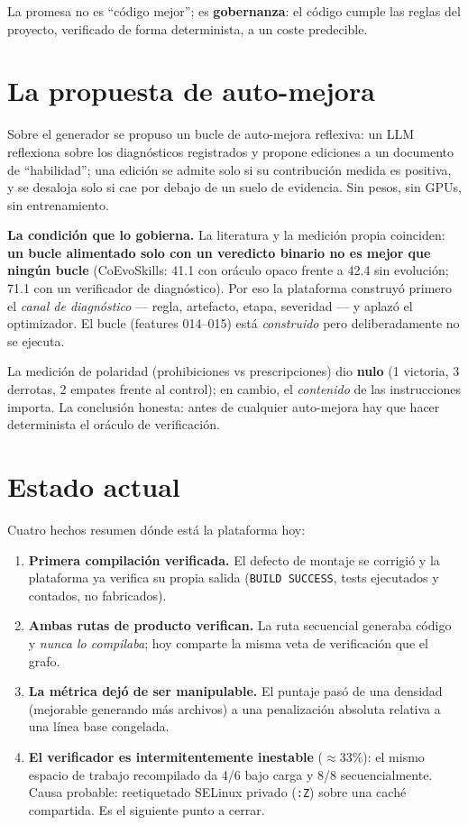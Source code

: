 \documentclass[11pt,a4paper]{article}
\begin{document}
La promesa no es ``código mejor''; es \textbf{gobernanza}: el código cumple las reglas
del proyecto, verificado de forma determinista, a un coste predecible.

\section{La propuesta de auto-mejora}

Sobre el generador se propuso un bucle de auto-mejora reflexiva: un LLM reflexiona
sobre los diagnósticos registrados y propone ediciones a un documento de
``habilidad''; una edición se admite solo si su contribución medida es positiva, y se
desaloja solo si cae por debajo de un suelo de evidencia. Sin pesos, sin GPUs, sin
entrenamiento.

\begin{notebox}
\textbf{La condición que lo gobierna.} La literatura y la medición propia coinciden:
\textbf{un bucle alimentado solo con un veredicto binario no es mejor que ningún
bucle} (CoEvoSkills: 41.1 con oráculo opaco frente a 42.4 sin evolución; 71.1 con un
verificador de diagnóstico). Por eso la plataforma construyó primero el \emph{canal de
diagnóstico} --- regla, artefacto, etapa, severidad --- y aplazó el optimizador. El
bucle (features 014--015) está \emph{construido} pero deliberadamente no se ejecuta.
\end{notebox}

La medición de polaridad (prohibiciones vs prescripciones) dio \textbf{nulo} (1
victoria, 3 derrotas, 2 empates frente al control); en cambio, el \emph{contenido} de
las instrucciones importa. La conclusión honesta: antes de cualquier auto-mejora hay
que hacer determinista el oráculo de verificación.

\section{Estado actual}

Cuatro hechos resumen dónde está la plataforma hoy:

\begin{enumerate}[leftmargin=1.4em]
  \item \textbf{Primera compilación verificada.} El defecto de montaje se corrigió y
  la plataforma ya verifica su propia salida (\texttt{BUILD SUCCESS}, tests
  ejecutados y contados, no fabricados).
  \item \textbf{Ambas rutas de producto verifican.} La ruta secuencial generaba código
  y \emph{nunca lo compilaba}; hoy comparte la misma veta de verificación que el grafo.
  \item \textbf{La métrica dejó de ser manipulable.} El puntaje pasó de una densidad
  (mejorable generando más archivos) a una penalización absoluta relativa a una línea
  base congelada.
  \item \textbf{El verificador es intermitentemente inestable} ($\approx$33\%): el
  mismo espacio de trabajo recompilado da 4/6 bajo carga y 8/8 secuencialmente. Causa
  probable: reetiquetado SELinux privado (\texttt{:Z}) sobre una caché compartida. Es
  el siguiente punto a cerrar.
\end{enumerate}
\end{document}
